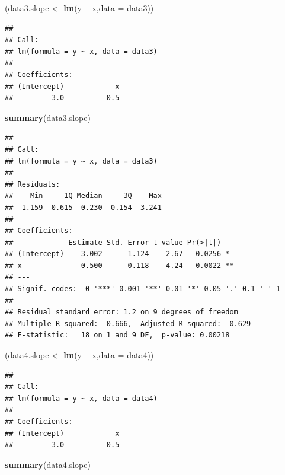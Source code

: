 \documentclass[]{article}
\newenvironment{Shaded}{\begin{snugshade}}{\end{snugshade}}
\newcommand{\KeywordTok}[1]{\textcolor[rgb]{0.13,0.29,0.53}{\textbf{#1}}}
\newcommand{\DataTypeTok}[1]{\textcolor[rgb]{0.13,0.29,0.53}{#1}}
\newcommand{\StringTok}[1]{\textcolor[rgb]{0.31,0.60,0.02}{#1}}
\newcommand{\OperatorTok}[1]{\textcolor[rgb]{0.81,0.36,0.00}{\textbf{#1}}}
\newcommand{\NormalTok}[1]{#1}
\begin{document}
\begin{Shaded}
\begin{Highlighting}[]
\NormalTok{(data3.slope <-}\StringTok{ }\KeywordTok{lm}\NormalTok{(y }\OperatorTok{~}\StringTok{ }\NormalTok{x,}\DataTypeTok{data =}\NormalTok{ data3))}
\end{Highlighting}
\end{Shaded}

\begin{verbatim}
## 
## Call:
## lm(formula = y ~ x, data = data3)
## 
## Coefficients:
## (Intercept)            x  
##         3.0          0.5
\end{verbatim}

\begin{Shaded}
\begin{Highlighting}[]
\KeywordTok{summary}\NormalTok{(data3.slope)}
\end{Highlighting}
\end{Shaded}

\begin{verbatim}
## 
## Call:
## lm(formula = y ~ x, data = data3)
## 
## Residuals:
##    Min     1Q Median     3Q    Max 
## -1.159 -0.615 -0.230  0.154  3.241 
## 
## Coefficients:
##             Estimate Std. Error t value Pr(>|t|)   
## (Intercept)    3.002      1.124    2.67   0.0256 * 
## x              0.500      0.118    4.24   0.0022 **
## ---
## Signif. codes:  0 '***' 0.001 '**' 0.01 '*' 0.05 '.' 0.1 ' ' 1
## 
## Residual standard error: 1.2 on 9 degrees of freedom
## Multiple R-squared:  0.666,  Adjusted R-squared:  0.629 
## F-statistic:   18 on 1 and 9 DF,  p-value: 0.00218
\end{verbatim}

\begin{Shaded}
\begin{Highlighting}[]
\NormalTok{(data4.slope <-}\StringTok{ }\KeywordTok{lm}\NormalTok{(y }\OperatorTok{~}\StringTok{ }\NormalTok{x,}\DataTypeTok{data =}\NormalTok{ data4))}
\end{Highlighting}
\end{Shaded}

\begin{verbatim}
## 
## Call:
## lm(formula = y ~ x, data = data4)
## 
## Coefficients:
## (Intercept)            x  
##         3.0          0.5
\end{verbatim}

\begin{Shaded}
\begin{Highlighting}[]
\KeywordTok{summary}\NormalTok{(data4.slope)}
\end{Highlighting}
\end{Shaded}
\end{document}
